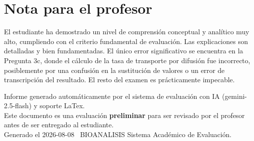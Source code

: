 \documentclass[11pt,a4paper]{article}
\begin{document}
\section*{Nota para el profesor}
\begin{tcolorbox}[
  enhanced, breakable,
  colback=yellow!8, colframe=yellow!60!black,
  fonttitle=\bfseries, coltitle=black,
  title={Observaciones para revisión manual},
  top=4pt, bottom=4pt, left=8pt, right=8pt,
]
El estudiante ha demostrado un nivel de comprensión conceptual y analítico muy alto, cumpliendo con el criterio fundamental de evaluación. Las explicaciones son detalladas y bien fundamentadas. El único error significativo se encuentra en la Pregunta 3c, donde el cálculo de la tasa de transporte por difusión fue incorrecto, posiblemente por una confusión en la sustitución de valores o un error de transcripción del resultado. El resto del examen es prácticamente impecable.
\end{tcolorbox}

\vspace{12pt}
\begin{center}
  \footnotesize\color{gray}
  Informe generado automáticamente por el sistema de evaluación con IA (gemini-2.5-flash) y soporte LaTex. \\
  Este documento es una evaluación \textbf{preliminar} para ser revisado por el profesor antes de ser entregado al 
  estudiante. \\
  Generado el 2026-08-08 \textbullet\ BIOANALISIS Sistema Académico de Evaluación.
  \end{center}
\end{document}

